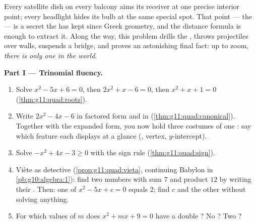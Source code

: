 \begin{problem}
\label{pb:g11:quad:1}
Every satellite dish on every balcony aims its receiver at one
precise interior point; every headlight hides its bulb at the
same special spot. That point --- the \emph{} --- is a
secret the  has kept since Greek geometry, and the
distance formula is enough to extract it. Along the way, this
problem drills the , throws projectiles over walls,
suspends a bridge, and proves an astonishing final fact: up to
zoom, \emph{there is only one  in the world}.

\medskip
\noindent\textbf{Part I --- Trinomial fluency.}
\begin{enumerate}
  \item Solve $x^2 - 5x + 6 = 0$, then $2x^2 + x - 6 = 0$, then
        $x^2 + x + 1 = 0$ (\cref{thm:g11:quad:roots}).
  \item Write $2x^2 - 4x - 6$ in factored form and in  (\cref{thm:g11:quad:canonical}). Together with the
        expanded form, you now hold three costumes of one
        : say which feature each displays at a glance
        (, vertex, $y$-intercept).
  \item Solve $-x^2 + 4x - 3 \geq 0$ with the sign rule
        (\cref{thm:g11:quad:sign}).
  \item Vi\`ete as detective (\cref{prop:g11:quad:vieta},
        continuing Babylon in \cref{pb:g10:algebra:1}): find two
        numbers with sum $7$ and product $12$ by writing their
        . Then: one  of $x^2 - 5x + c = 0$ equals
        $2$; find $c$ and the other  without solving
        anything.
  \item For which values of $m$ does $x^2 + mx + 9 = 0$ have a
        double ? No ? Two ?
\end{enumerate}


\end{problem}
